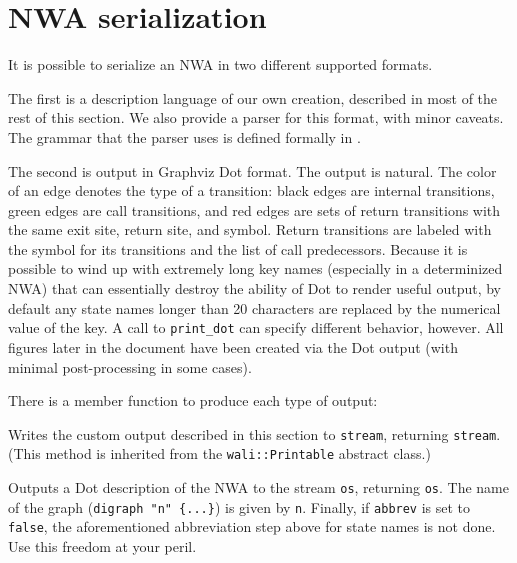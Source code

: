 \section{NWA serialization}
\label{Se:serialization}

\newenvironment{grammar}{\begin{equation*}\begin{array}{lrl}}{\end{array}\end{equation*}}
\newcommand{\nonterm}[1]{\ensuremath{\langle}\textit{#1}\ensuremath{\rangle}}
\newcommand{\term}[1]{\textrm`\texttt{#1}\textrm'}
\newcommand{\cfgsp}{\ \ }


It is possible to serialize an NWA in two different supported
formats.

The first is a description language of our own creation, described in
most of the rest of this section. We also provide a parser for this format,
with minor caveats. The grammar that the parser uses is defined
formally in .

The second is output in Graphviz Dot format. The output is natural. The color
of an edge denotes the type of a transition: black edges are internal
transitions, green edges are call transitions, and red edges are sets of return
transitions with the same exit site, return site, and symbol. Return
transitions are labeled with the symbol for its
transitions and the list of call predecessors.  Because it is possible to wind up with
extremely long key names (especially in a determinized NWA) that can
essentially destroy the ability of Dot to render useful output, by default
any state names longer than 20 characters are replaced by the numerical
value of the key. A call to \texttt{print\_dot} can specify different behavior, however.
All figures later in the document have been created via the Dot output (with
minimal post-processing in some cases).

There is a member function to produce each type of output:
\begin{functionlist}
    Writes the custom output described in this section
    to \texttt{stream}, returning \texttt{stream}.
    (This method is inherited from
    the \texttt{wali::Printable} abstract class.)

    Outputs a Dot description of the NWA to the stream \texttt{os}, returning
    \texttt{os}.  The name of the graph (\texttt{digraph "n" \{...\}}) is
    given by \texttt{n}. Finally, if \texttt{abbrev} is set to
    \texttt{false}, the aforementioned abbreviation step above for state
    names is not done. Use this freedom at your peril.
\end{functionlist}

